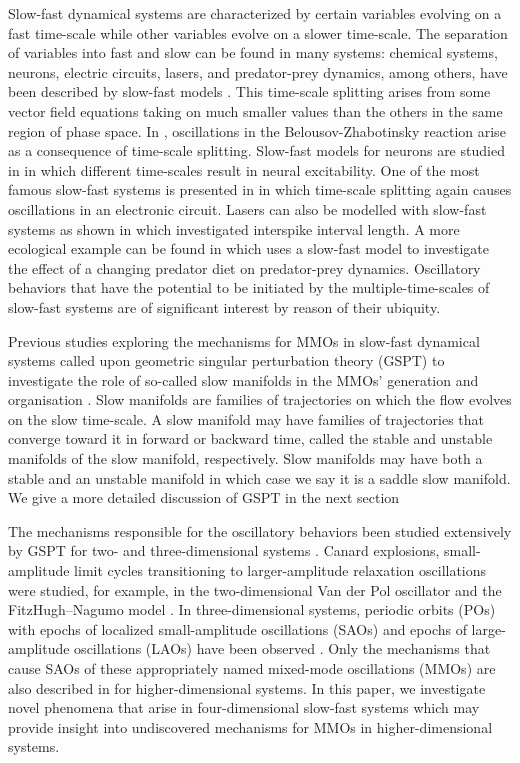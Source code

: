 \documentclass{ws-ijbc}
\begin{document}
Slow-fast dynamical systems are characterized by certain variables evolving on a fast time-scale while other variables evolve on a slower time-scale.  The separation of variables into fast and slow can be found in many systems: chemical systems, neurons, electric circuits, lasers, and predator-prey dynamics, among others, have been described by slow-fast models  \cite{BZ_reaction, Neurons, Circuits, lasers, Predator-Prey}.  This time-scale splitting arises from some vector field equations taking on much smaller values than the others in the same region of phase space.  In \cite{BZ_reaction}, oscillations in the Belousov-Zhabotinsky reaction arise as a consequence of time-scale splitting.  Slow-fast models for neurons are studied in \cite{Neurons} in which different time-scales result in neural excitability.  One of the most famous slow-fast systems is presented in \cite{Circuits} in which time-scale splitting again causes oscillations in an electronic circuit.  Lasers can also be modelled with slow-fast systems as shown in \cite{lasers} which investigated interspike interval length.  A more ecological example can be found in \cite{Predator-Prey} which uses a slow-fast model to investigate the effect of a changing predator diet on predator-prey dynamics.  Oscillatory behaviors that have the potential to be initiated by the multiple-time-scales of slow-fast systems are of significant interest by reason of their ubiquity.

Previous studies exploring the mechanisms for MMOs in slow-fast dynamical systems called upon geometric singular perturbation theory (GSPT) to investigate the role of so-called slow manifolds in the MMOs' generation and organisation \cite{Vo_paper, Vo_paper2, Emily_Harvey_paper, Martin_neuron_paper, Cris_paper}.  Slow manifolds are families of trajectories on which the flow evolves on the slow time-scale.  A slow manifold may have families of trajectories that converge toward it in forward or backward time, called the stable and unstable manifolds of the slow manifold, respectively.  Slow manifolds may have both a stable and an unstable manifold in which case we say it is a saddle slow manifold.  We give a more detailed discussion of GSPT in the next section

The mechanisms responsible for the oscillatory behaviors been studied extensively by GSPT for two- and three-dimensional systems \cite{canard_explosion, lents-rapides, enlacement,singular_hopf, folded_node,three}.  Canard explosions, small-amplitude limit cycles transitioning to larger-amplitude relaxation oscillations were studied, for example, in the two-dimensional Van der Pol oscillator and the FitzHugh--Nagumo model \cite{canard_explosion, fitz-hugh-nagumo}.  In three-dimensional systems, periodic orbits (POs) with epochs of localized small-amplitude oscillations (SAOs) and epochs of large-amplitude oscillations (LAOs) have been observed \cite{BZ}.  Only the mechanisms that cause SAOs of these appropriately named mixed-mode oscillations (MMOs) are also described in \cite{MMO} for higher-dimensional systems.  In this paper, we investigate novel phenomena that arise in four-dimensional slow-fast systems which may provide insight into undiscovered mechanisms for MMOs in higher-dimensional systems.
\end{document}
